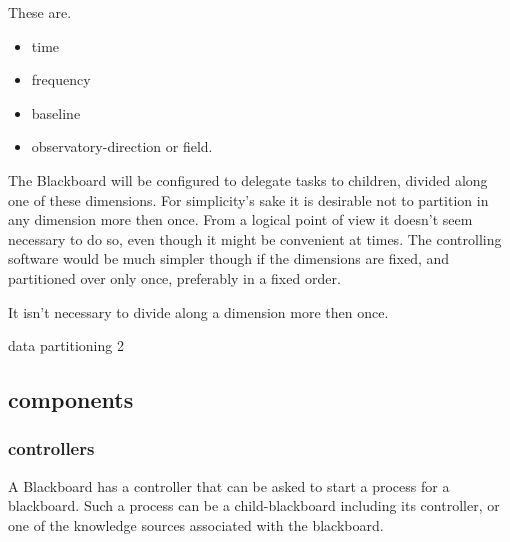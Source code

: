 \documentclass[]{lofar}
\begin{document}
      These are.

      \begin{itemize}

        \item 

          time

	\item 

          frequency

	\item 

          baseline

	\item 

          observatory-direction or field.

      \end{itemize}

      The Blackboard will be configured to delegate tasks to children,
      divided along one of these dimensions. For simplicity's sake it
      is desirable not to partition in any dimension more then
      once. From a logical point of view it doesn't seem necessary to
      do so, even though it might be convenient at times. The
      controlling software would be much simpler though if the
      dimensions are fixed, and partitioned over only once,
      preferably in a fixed order.

      \begin{assumption}
        It isn't necessary to divide along a dimension more then once.
        \caption{data partitioning 2\label{ass:devision}}
      \end{assumption}

    \subsection{components}
    \label{subsec:components}\hypertarget{subsec:components}{}

      \subsubsection{controllers}
      \label{subsubsec:controllers}\hypertarget{subsubsec:controllers}{}

        A Blackboard has a controller that can be asked to start a
        process for a blackboard. Such a process can be a
        child-blackboard including its controller, or one of the
        knowledge sources associated with the blackboard.
\end{document}
